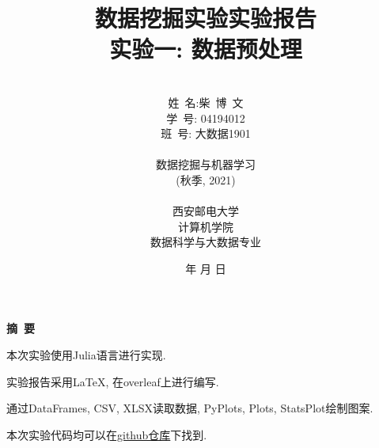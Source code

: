 \documentclass[a4paper]{article}
\begin{document}
\renewcommand{\contentsname}{目\ 录}
\renewcommand{\appendixname}{附录}
\renewcommand{\appendixpagename}{附录}
\renewcommand{\refname}{参考文献} 
\renewcommand{\figurename}{图}
\renewcommand{\tablename}{表}
\renewcommand{\today}{\number\year 年 \number\month 月 \number\day 日}

\title{{\Huge 数据挖掘实验实验报告{\large\linebreak\\}}{\Large 实验一: 数据预处理\linebreak\linebreak}}
\author{\\姓\ 名:柴\ 博\ 文\\ 
学\ 号: 04194012\\
班\ 号: 大数据1901\\\\
数据挖掘与机器学习\\
(秋季, 2021)\\\\
西安邮电大学\\
计算机学院\\
数据科学与大数据专业}
\date{\today}
\maketitle
\newpage

\begin{center}
{\Large\bf{摘\ 要\\}}
\end{center}
本次实验使用Julia语言进行实现.

实验报告采用LaTeX, 在overleaf上进行编写.

通过DataFrames, CSV, XLSX读取数据, PyPlots, Plots, StatsPlot绘制图案.

本次实验代码均可以在\href{https://github.com/lovebaihezi/lab/tree/main/data-process/lab1/julia}{github仓库}下找到.

\newpage
\begin{center}
\tableofcontents\label{c}
\end{center}
\newpage


\end{document}
